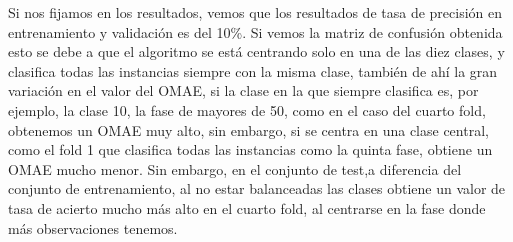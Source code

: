 


Si nos fijamos en los resultados, vemos que los resultados de tasa de precisión en entrenamiento y validación es del 10\%. Si vemos la matriz de confusión obtenida esto se debe a que el algoritmo se está centrando solo en una de las diez clases, y clasifica todas las instancias siempre con la misma clase, también de ahí la gran variación en el valor del OMAE, si la clase en la que siempre clasifica es, por ejemplo, la clase 10, la fase de mayores de 50, como en el caso del cuarto fold, obtenemos un OMAE muy alto, sin embargo, si se centra en una clase central, como el fold 1 que clasifica todas las instancias como la quinta fase, obtiene un OMAE mucho menor. Sin embargo, en el conjunto de test,a diferencia del conjunto de entrenamiento, al no estar balanceadas las clases obtiene un valor de tasa de acierto mucho más alto en el cuarto fold, al centrarse en la fase donde más observaciones tenemos.


